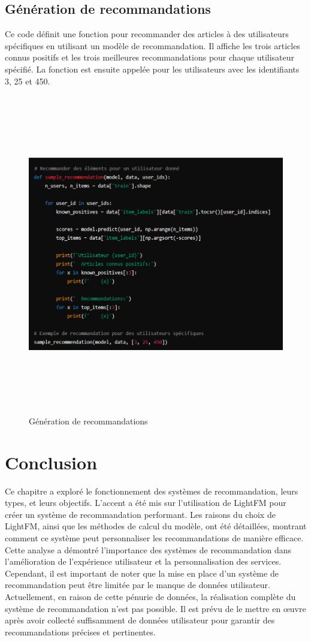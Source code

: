 \documentclass[edit,12pt,a4paper,ChapStyle,oneside,doubleinterligne]{report}
\begin{document}
\subsection{Génération de recommandations}
Ce code définit une fonction pour recommander des articles à des utilisateurs spécifiques en utilisant un modèle de recommandation. Il affiche les trois articles connus positifs et les trois meilleures recommandations pour chaque utilisateur spécifié. La fonction est ensuite appelée pour les utilisateurs avec les identifiants 3, 25 et 450.
\begin{figure} [H]
    \centering
    \includegraphics[width=15.742708333cm , height = 14cm , angle=360]{images/Génération de recommandations.png}
    \caption{Génération de recommandations}
    \label{fig:Génération de recommandations}
\end{figure}
\section{Conclusion}
Ce chapitre a exploré le fonctionnement des systèmes de recommandation, leurs types, et leurs objectifs. L'accent a été mis sur l'utilisation de LightFM pour créer un système de recommandation performant. Les raisons du choix de LightFM, ainsi que les méthodes de calcul du modèle, ont été détaillées, montrant comment ce système peut personnaliser les recommandations de manière efficace. Cette analyse a démontré l'importance des systèmes de recommandation dans l'amélioration de l'expérience utilisateur et la personnalisation des services.
\newline
Cependant, il est important de noter que la mise en place d'un système de recommandation peut être limitée par le manque de données utilisateur. Actuellement, en raison de cette pénurie de données, la réalisation complète du système de recommandation n'est pas possible. Il est prévu de le mettre en œuvre après avoir collecté suffisamment de données utilisateur pour garantir des recommandations précises et pertinentes.
\end{document}
